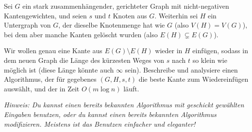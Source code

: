 \documentclass{uebung_cs}
\begin{document}
Sei $G$ ein stark zusammenhängender, gerichteter Graph mit nicht-negativen Kantengewichten, und seien $s$ und $t$ Knoten aus $G$.
Weiterhin sei $H$ ein Untergraph von $G$, der dieselbe Knotenmenge hat wie $G$ (also $V(H)=V(G)$), bei dem aber manche Kanten gelöscht wurden (also $E(H)\subsetneq E(G)$).

Wir wollen genau eine Kante aus $E(G)\setminus E(H)$ wieder in $H$ einfügen, sodass in dem neuen Graph die Länge des kürzesten Weges von $s$ nach $t$ so klein wie möglich ist (diese Länge könnte auch $\infty$ sein).
Beschreibe und analysiere einen Algorithmus, der für gegebenes $(G,H,s,t)$ die beste Kante zum Wiedereinfügen auswählt, und der in Zeit $O(m\log n)$ läuft.

\emph{Hinweis: Du kannst einen bereits bekannten Algorithmus mit geschickt gewählten Eingaben benutzen, oder du kannst einen bereits bekannten Algorithmus modifizieren. Meistens ist das Benutzen einfacher und eleganter!}


\end{document}
